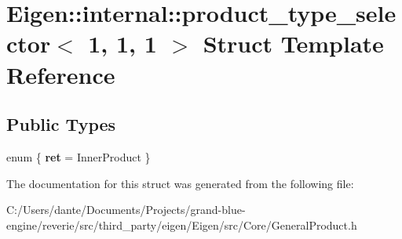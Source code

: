 \hypertarget{struct_eigen_1_1internal_1_1product__type__selector_3_011_00_011_00_011_01_4}{}\section{Eigen\+::internal\+::product\+\_\+type\+\_\+selector$<$ 1, 1, 1 $>$ Struct Template Reference}
\label{struct_eigen_1_1internal_1_1product__type__selector_3_011_00_011_00_011_01_4}
\subsection*{Public Types}
\begin{DoxyCompactItemize}
\item 
\mbox{\label{struct_eigen_1_1internal_1_1product__type__selector_3_011_00_011_00_011_01_4_ad7a37efc70f92a03f24fc07e16a41a05}} 
enum \{ {\bfseries ret} = Inner\+Product
 \}
\end{DoxyCompactItemize}


The documentation for this struct was generated from the following file\+:\begin{DoxyCompactItemize}
\item 
C\+:/\+Users/dante/\+Documents/\+Projects/grand-\/blue-\/engine/reverie/src/third\+\_\+party/eigen/\+Eigen/src/\+Core/General\+Product.\+h\end{DoxyCompactItemize}

